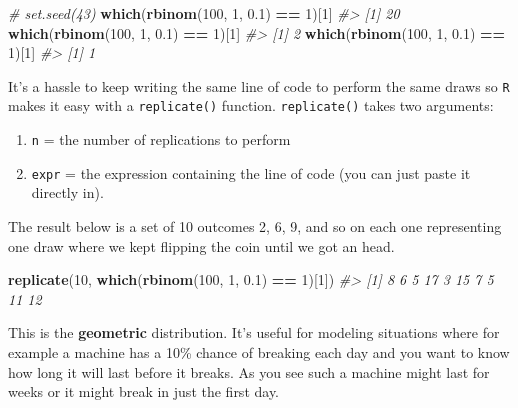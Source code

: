 \documentclass[]{article}
\newenvironment{Shaded}{\begin{snugshade}}{\end{snugshade}}
\newcommand{\CommentTok}[1]{\textcolor[rgb]{0.56,0.35,0.01}{\textit{#1}}}
\newcommand{\DecValTok}[1]{\textcolor[rgb]{0.00,0.00,0.81}{#1}}
\newcommand{\FloatTok}[1]{\textcolor[rgb]{0.00,0.00,0.81}{#1}}
\newcommand{\KeywordTok}[1]{\textcolor[rgb]{0.13,0.29,0.53}{\textbf{#1}}}
\newcommand{\NormalTok}[1]{#1}
\newcommand{\OperatorTok}[1]{\textcolor[rgb]{0.81,0.36,0.00}{\textbf{#1}}}
\newcommand{\StringTok}[1]{\textcolor[rgb]{0.31,0.60,0.02}{#1}}
\providecommand{\tightlist}{%
  \setlength{\itemsep}{0pt}\setlength{\parskip}{0pt}}
\begin{document}
\begin{Shaded}
\begin{Highlighting}[]
\CommentTok{# set.seed(43)}
\KeywordTok{which}\NormalTok{(}\KeywordTok{rbinom}\NormalTok{(}\DecValTok{100}\NormalTok{, }\DecValTok{1}\NormalTok{, }\FloatTok{0.1}\NormalTok{) }\OperatorTok{==}\StringTok{ }\DecValTok{1}\NormalTok{)[}\DecValTok{1}\NormalTok{]}
\CommentTok{#> [1] 20}
\KeywordTok{which}\NormalTok{(}\KeywordTok{rbinom}\NormalTok{(}\DecValTok{100}\NormalTok{, }\DecValTok{1}\NormalTok{, }\FloatTok{0.1}\NormalTok{) }\OperatorTok{==}\StringTok{ }\DecValTok{1}\NormalTok{)[}\DecValTok{1}\NormalTok{]}
\CommentTok{#> [1] 2}
\KeywordTok{which}\NormalTok{(}\KeywordTok{rbinom}\NormalTok{(}\DecValTok{100}\NormalTok{, }\DecValTok{1}\NormalTok{, }\FloatTok{0.1}\NormalTok{) }\OperatorTok{==}\StringTok{ }\DecValTok{1}\NormalTok{)[}\DecValTok{1}\NormalTok{]}
\CommentTok{#> [1] 1}
\end{Highlighting}
\end{Shaded}

It's a hassle to keep writing the same line of code to perform the same
draws so \texttt{R} makes it easy with a \texttt{replicate()} function.
\texttt{replicate()} takes two arguments:

\begin{enumerate}
\def\labelenumi{\arabic{enumi}.}
\tightlist
\item
  \texttt{n} = the number of replications to perform
\item
  \texttt{expr} = the expression containing the line of code (you can
  just paste it directly in).
\end{enumerate}

The result below is a set of 10 outcomes 2, 6, 9, and so on each one
representing one draw where we kept flipping the coin until we got an
head.

\begin{Shaded}
\begin{Highlighting}[]
\KeywordTok{replicate}\NormalTok{(}\DecValTok{10}\NormalTok{, }\KeywordTok{which}\NormalTok{(}\KeywordTok{rbinom}\NormalTok{(}\DecValTok{100}\NormalTok{, }\DecValTok{1}\NormalTok{, }\FloatTok{0.1}\NormalTok{) }\OperatorTok{==}\StringTok{ }\DecValTok{1}\NormalTok{)[}\DecValTok{1}\NormalTok{])}
\CommentTok{#>  [1]  8  6  5 17  3 15  7  5 11 12}
\end{Highlighting}
\end{Shaded}

This is the \textbf{geometric} distribution. It's useful for modeling
situations where for example a machine has a 10\% chance of breaking
each day and you want to know how long it will last before it breaks. As
you see such a machine might last for weeks or it might break in just
the first day.
\end{document}

